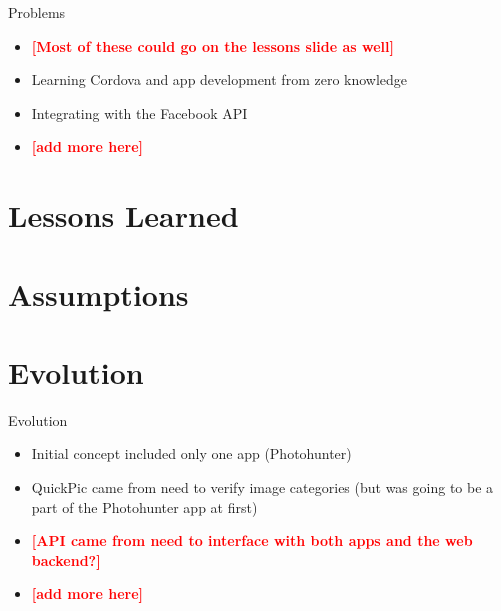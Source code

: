 \documentclass[aspectratio=169]{beamer}
\newcommand{\todo}[1]{\textcolor{red}{\textbf{[#1]}}}
\begin{document}
\begin{frame}{Problems}
	\begin{itemize}

		\item \todo{Most of these could go on the lessons slide as well}

		\item Learning Cordova and app development from zero knowledge

		\item Integrating with the Facebook API

		\item \todo{add more here}

	\end{itemize}
\end{frame}

\section{Lessons Learned}

\section{Assumptions}

\section{Evolution}

\begin{frame}{Evolution}
	\begin{itemize}

		\item Initial concept included only one app (Photohunter)

		\item QuickPic came from need to verify image categories (but was going to
					be a part of the Photohunter app at first)

		\item \todo{API came from need to interface with both apps and the web backend?}

		\item \todo{add more here}

	\end{itemize}
\end{frame}
\end{document}
